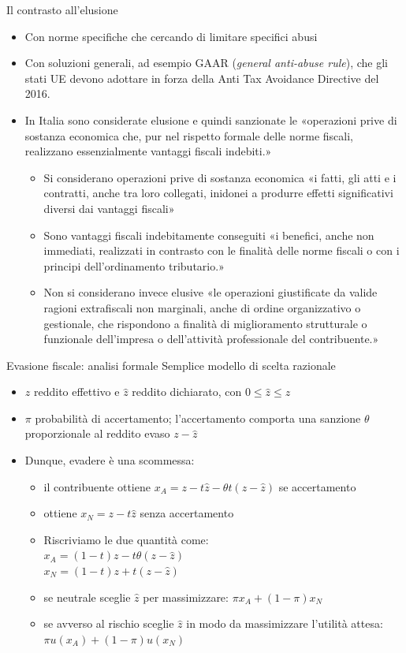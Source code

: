 \documentclass[aspectratio=64,11pt]{beamer}
\begin{document}
\begin{frame}{Il contrasto all'elusione}
\begin{itemize}
\item Con norme specifiche che cercando di limitare specifici abusi
\item Con soluzioni generali, ad esempio GAAR (\emph{general anti-abuse rule}), che gli
stati UE devono adottare in forza della Anti Tax Avoidance Directive
del 2016.
\item In Italia sono considerate elusione e quindi sanzionate le «operazioni prive
di sostanza economica che, pur nel rispetto formale delle norme fiscali,
realizzano essenzialmente vantaggi fiscali indebiti.»
\begin{itemize}
\item Si considerano \alert{operazioni prive di sostanza economica} «i fatti, gli atti
e i contratti, anche tra loro collegati, inidonei a produrre effetti
significativi diversi dai vantaggi fiscali»
\item Sono \alert{vantaggi fiscali indebitamente conseguiti} «i benefici, anche non
immediati, realizzati in contrasto con le finalità delle norme fiscali o
con i principi dell'ordinamento tributario.»
\item Non si considerano invece elusive «le operazioni giustificate da valide
ragioni extrafiscali non marginali, anche di ordine organizzativo o
gestionale, che rispondono a finalità di miglioramento strutturale o
funzionale dell'impresa o dell'attività professionale del contribuente.»
\end{itemize}
\end{itemize}
\end{frame}
\begin{frame}{Evasione fiscale: analisi formale}
Semplice modello di scelta razionale
\begin{itemize}
\item $z$ reddito effettivo e $\hat{z}$ reddito dichiarato, con $0\le\hat{z}\le z$
\item $\pi$ probabilità di accertamento; l'accertamento comporta una sanzione
$\theta$ proporzionale al reddito evaso $z-\hat{z}$
\item Dunque, evadere è una scommessa:
\begin{itemize}
\item il contribuente ottiene $x_A=z-t\hat{z}-\theta t(z-\hat z)$ se accertamento
\item ottiene $x_N=z-t\hat{z}$ senza accertamento
\item Riscriviamo le due quantità come:\\[0pt]
$x_A=(1-t)z-t\theta(z-\hat z)$ \\[0pt]
$x_N=(1-t)z+t(z-\hat z)$
\item se neutrale sceglie $\hat z$ per massimizzare: $\pi x_A + (1-\pi) x_N$
\item se avverso al rischio sceglie $\hat z$ in modo da massimizzare l'utilità attesa: $\pi
    u(x_A)+(1-\pi)u(x_N)$
\end{itemize}
\end{itemize}
\end{frame}
\end{document}
